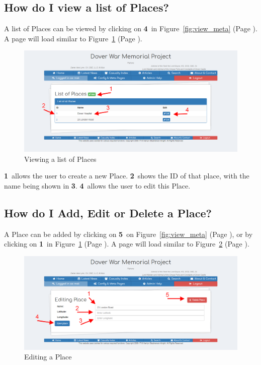 \documentclass[12pt]{article}
\newcommand{\marker}[1]{\color{red}\textbf{#1}\color{black}}
\newcommand{\myref}[1]{\ref{#1} {\scriptsize(Page \pageref{#1})}}
\begin{document}
\newpage
\FloatBarrier
\subsection{How do I view a list of Places?} \label{ssec:view_place}
A list of Places can be viewed by clicking on \marker{4}\ in Figure~\myref{fig:view_meta}. A page will load similar to Figure~\myref{fig:view_place}.

\begin{figure}[h]
  \centering
 \includegraphics[width=.9\textwidth]{pics/view_place.png}
	\caption{Viewing a list of Places}\label{fig:view_place}
\end{figure}

\marker{1}\ allows the user to create a new Place. \marker{2}\ shows the ID of that place, with the name being shown in \marker{3}. \marker{4}\ allows the user to edit this Place.

\newpage
\FloatBarrier
\subsection{How do I Add, Edit or Delete a Place?}\label{ssec:edit_place}
A Place can be added by clicking on \marker{5}\ on Figure~\myref{fig:view_meta}, or by clicking on \marker{1}\ in Figure~\myref{fig:view_place}. A page will load similar to Figure~\myref{fig:edit_place}.

\begin{figure}[h]
  \centering
 \includegraphics[width=.9\textwidth]{pics/edit_place.png}
	\caption{Editing a Place}\label{fig:edit_place}
\end{figure}
\end{document}
